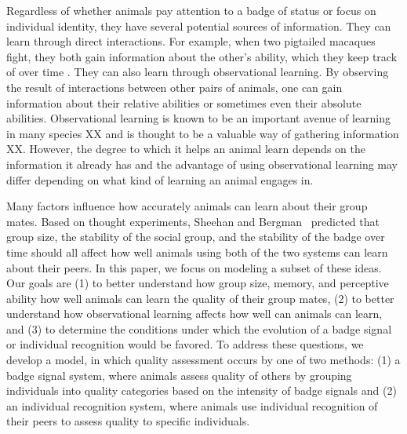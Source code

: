 Regardless of whether animals pay attention to a badge of status or focus on individual identity, they have several potential sources of information. They can learn through direct interactions. For example, when two pigtailed macaques fight, they both gain information about the other's ability, which they keep track of over time \cite{Flack:2007kx,Flack:2006uq}. They can also learn through observational learning. By observing the result of interactions between other pairs of animals, one can gain information about their relative abilities or sometimes even their absolute abilities. Observational learning is known to be an important avenue of learning in many species XX and is thought to be a valuable way of gathering information XX. However, the degree to which it helps an animal learn depends on the information it already has and the advantage of using observational learning may differ depending on what kind of learning an animal engages in.

Many factors influence how accurately animals can learn about their group mates. Based on  thought experiments, Sheehan and Bergman~\cite{sheehan2016evotradeoff} predicted that group size, the stability of the social group, and the stability of the badge over time should all affect how well animals using both of the two systems can learn about their peers. In this paper, we focus on modeling a subset of these ideas. Our goals are (1) to better understand how group size, memory, and perceptive ability how well animals can learn the quality of their group mates, (2) to better understand how observational learning affects how well can animals can learn, and (3) to determine the conditions under which the evolution of a badge signal or individual recognition would be favored. To address these questions, we develop a model, in which quality assessment occurs by one of two methods: (1) a badge signal system, where animals assess quality of others by grouping individuals into quality categories based on the intensity of badge signals and (2) an individual recognition system, where animals use individual recognition of their peers to assess quality to specific individuals.  


